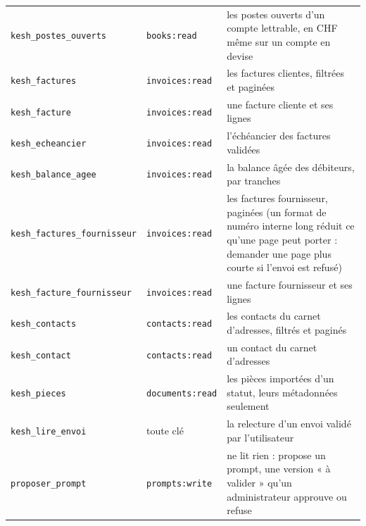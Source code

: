 \documentclass[a4paper,11pt,oneside]{article}
\begin{document}
\begin{center}
\begin{tabular}{p{4.6cm}p{2.4cm}p{7.2cm}}
\texttt{kesh\_postes\_ouverts} & \texttt{books:read} & les postes ouverts d'un compte lettrable, en CHF même sur un compte en devise \\
\texttt{kesh\_factures} & \texttt{invoices:read} & les factures clientes, filtrées et paginées \\
\texttt{kesh\_facture} & \texttt{invoices:read} & une facture cliente et ses lignes \\
\texttt{kesh\_echeancier} & \texttt{invoices:read} & l'échéancier des factures validées \\
\texttt{kesh\_balance\_agee} & \texttt{invoices:read} & la balance âgée des débiteurs, par tranches \\
\texttt{kesh\_factures\_fournisseur} & \texttt{invoices:read} & les factures fournisseur, paginées (un format de numéro interne long réduit ce qu'une page peut porter : demander une page plus courte si l'envoi est refusé) \\
\texttt{kesh\_facture\_fournisseur} & \texttt{invoices:read} & une facture fournisseur et ses lignes \\
\texttt{kesh\_contacts} & \texttt{contacts:read} & les contacts du carnet d'adresses, filtrés et paginés \\
\texttt{kesh\_contact} & \texttt{contacts:read} & un contact du carnet d'adresses \\
\texttt{kesh\_pieces} & \texttt{documents:read} & les pièces importées d'un statut, leurs métadonnées seulement \\
\texttt{kesh\_lire\_envoi} & toute clé & la relecture d'un envoi validé par l'utilisateur \\
\texttt{proposer\_prompt} & \texttt{prompts:write} & ne lit rien : propose un prompt, une version « à valider » qu'un administrateur approuve ou refuse \\
\end{tabular}
\end{center}
\end{document}
